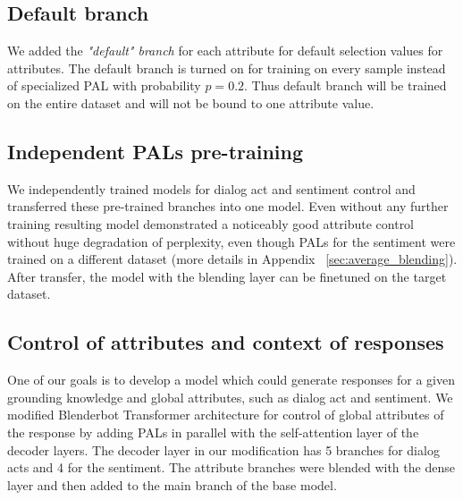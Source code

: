 \documentclass[11pt]{article}
\begin{document}
\subsection{Default branch}
We added the \textit{"default" branch} for each attribute for default selection values for attributes. 
The default branch is turned on for training on every sample instead of specialized PAL with probability $p = 0.2$. Thus default branch will be trained on the entire dataset and will not be bound to one attribute value.

\subsection{Independent PALs pre-training}
We independently trained models for dialog act and sentiment control and transferred these pre-trained branches into one model. Even without any further training resulting model demonstrated a noticeably good attribute control without huge degradation of perplexity, even though PALs for the sentiment were trained on a different dataset (more details in Appendix ~\ref{sec:average_blending}). After transfer, the model with the blending layer can be finetuned on the target dataset. 

\subsection{Control of attributes and context of responses}

One of our goals is to develop a model which could generate responses for a given grounding knowledge and global attributes, such as dialog act and sentiment. %
We modified Blenderbot  Transformer architecture for control of global attributes of the response by adding PALs in parallel with the self-attention layer of the decoder layers. The decoder layer in our modification has 5 branches for dialog acts and 4 for the sentiment. The attribute branches were blended with the dense layer and then added to the main branch of the base model.
\end{document}
